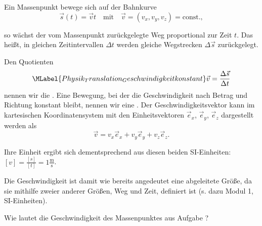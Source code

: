 \begin{MContent}


Ein Massenpunkt bewege sich auf der Bahnkurve
\begin{equation*}
\vec{s}(t)=\vec{v}t \quad \textrm{mit} \quad \vec{v}=(v_x,v_y,v_z)=\textrm{const.},
\end{equation*}

so w\"achst der vom Massenpunkt zur\"uckgelegte Weg proportional zur Zeit $t$. Das hei{\ss}t, in gleichen Zeitintervallen $\Delta t$ werden gleiche Wegstrecken $\Delta \vec{s}$ zur\"uckgelegt. 

\begin{MInfo}
 Den Quotienten 
 \begin{equation}\MLabel{Physik_Translation_Geschwindigkeitkonstant}
 \vec{v}=\frac{\Delta \vec{s}}{\Delta t}
 \end{equation} nennen wir die . Eine Bewegung, bei der die Geschwindigkeit nach Betrag und Richtung konstant bleibt, nennen wir eine . Der Geschwindigkeitsvektor kann im kartesischen Koordinatensystem mit den Einheitsvektoren $\vec{e}_x$,  $\vec{e}_y$,  $\vec{e}_z$ dargestellt werden als
 \begin{equation*}
 \vec{v}=v_x\vec{e}_x+v_y\vec{e}_y+v_z\vec{e}_z.
 \end{equation*}
 
 Ihre Einheit ergibt sich dementsprechend aus diesen beiden SI-Einheiten: $[v]=\frac{[s]}{[t]}=1\frac{\text{m}}{\text{s}}$.
 
 \end{MInfo}
 
 Die Geschwindigkeit ist damit wie bereits angedeutet eine abgeleitete Gr\"o{\ss}e, da sie mithilfe zweier anderer Gr\"o{\ss}en, Weg und Zeit, definiert ist (s. dazu Modul 1, SI-Einheiten). 
 
 \begin{MExercise} Wie lautet die Geschwindigkeit des Massenpunktes aus Aufgabe ?
 

\end{MExercise}
\end{MContent}
